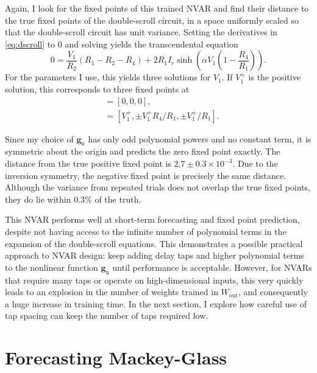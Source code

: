 Again, I look for the fixed points of this trained NVAR and find
their distance to the true fixed points of the double-scroll circuit,
in a space uniformly scaled so that the double-scroll circuit has unit
variance. Setting the derivatives in \cref{eq:dscroll} to $0$
and solving yields the transcendental equation
\begin{equation}
  0 = \frac{V_1}{R_2}(R_1 - R_2 - R_4) + 2 R_1 I_r \sinh\left(\alpha V_1 \left(1 - \frac{R_4}{R_1}\right)\right).
\end{equation}
For the parameters I use, this yields three solutions for $V_1$. If
$V_1^+$ is the positive solution, this corresponds to three fixed points
at
\begin{align}
  [V_1, V_2, I] &= [0, 0, 0], \\
                &= [V_1^+, \pm V_1^+ R_4 / R_1, \pm V_1^+ / R_1].
\end{align}

Since my choice of $\bm{g}_\text{n}$ has only odd polynomial powers
and no constant term, it is symmetric about the origin and predicts
the zero fixed point exactly. The distance from the true positive
fixed point is $2.7\pm0.3\times10^{-3}$. Due to the inversion
symmetry, the negative fixed point is precisely the same
distance. Although the variance from repeated trials does not overlap
the true fixed points, they do lie within $0.3\%$ of the truth.

This NVAR performs well at short-term forecasting and fixed point
prediction, despite not having access to the infinite number of
polynomial terms in the expansion of the double-scroll equations. This
demonstrates a possible practical approach to NVAR design: keep adding
delay taps and higher polynomial terms to the nonlinear function
$\bm{g}_\text{n}$ until performance is acceptable. However, for NVARs
that require many taps or operate on high-dimensional inputs, this
very quickly leads to an explosion in the number of weights trained in
$W_\text{out}$, and consequently a huge increase in training time. In
the next section, I explore how careful use of tap spacing can
keep the number of taps required low.

\section{Forecasting Mackey-Glass}\label{sec:nvar-mackey-glass}

